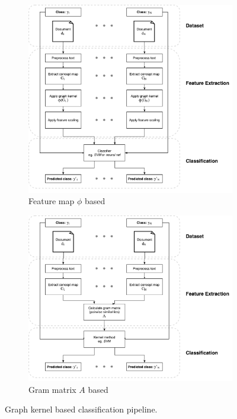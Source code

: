 \begin{figure}[htb!]
	\centering
	\begin{subfigure}[b]{0.48\linewidth}\includegraphics[width=\linewidth]{assets/figures/graph_classification_phi.pdf}
		\caption{Feature map $\phi$ based}
	\end{subfigure}
	\hfill
	\begin{subfigure}[b]{0.48\linewidth}\includegraphics[width=\linewidth]{assets/figures/graph_classification.pdf}
		\caption{Gram matrix $A$ based}
	\end{subfigure}
	\caption[Diagram: Graph kernel based classification]{Graph kernel based classification pipeline.}
\end{figure}

